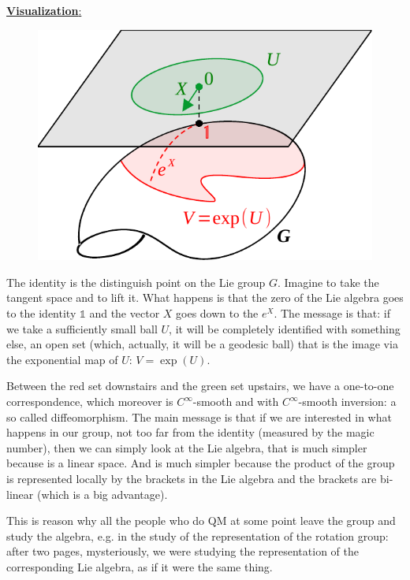 \documentclass[../main.tex]{subfiles}
\begin{document}
\underline{\textbf{Visualization}:}
\begin{figure}[h!]
	\includegraphics[width=1\linewidth]{images/visualization_corollary.pdf}
	\caption[Visualization of the corollary]{}
\end{figure}
The identity is the distinguish point on the Lie group $G$. Imagine to take the tangent space and to lift it. What happens is that the zero of the Lie algebra goes to the identity $\mathbb{1}$ and the vector $X$ goes down to the $e^X$. The message is that: if we take a sufficiently small ball $U$, it will be completely identified with something else, an open set (which, actually, it will be a geodesic ball) that is the image via the exponential map of $U$: $V=\exp(U)$.

Between the red set downstairs and the green set upstairs, we have a one-to-one correspondence, which moreover is $C^\infty$-smooth and with $C^\infty$-smooth inversion: a so called diffeomorphism. The main message is that if we are interested in what happens in our group, not too far from the identity (measured by the magic number), then we can simply look at the Lie algebra, that is much simpler because is a linear space. And is much simpler because the product of the group is represented locally by the brackets in the Lie algebra and the brackets are bi-linear (which is a big advantage). 

This is reason why all the people who do QM at some point leave the group and study the algebra, e.g. in the study of the representation of the rotation group: after two pages, mysteriously, we were studying the representation of the corresponding Lie algebra, as if it were the same thing.
\end{document}
